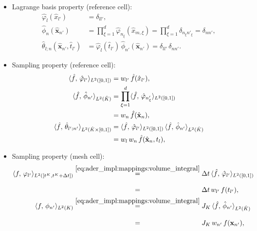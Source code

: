 \documentclass{scrreprt}
\theoremstyle{definition}
\theoremstyle{nonumberplain}
\renewcommand{\vec}[1]{{\textbf{#1}}}
\newcommand{\cell}{K}
\newcommand{\refVec}[1]{\hat{\vec{#1}}}
\newcommand{\refCell}{\hat{\cell}}
\newcommand{\detJ}{J_\cell}
\begin{document}
\begin{itemize}
  \item Lagrange basis property (reference cell):
  \begin{align}
\label{eq:ader_impl:basis:lagrange_ref_1d}
{\hat{\varphi}}_{l} (\hat{x}_{l'}) &= \delta_{ll'},\\
{\hat{\phi}}_{n} (\refVec{x}_{n'}) &= \prod_{\xi=1}^d
{\hat{\varphi}}_{n_{\xi}} (\hat{x}_{m,\xi})
=
\prod_{\xi=1}^{d}
\delta_{n_\xi n'_\xi}
= \delta_{n n'},
\\
{\hat{\theta}}_{l;n} (\refVec{x}_{n'},\hat{t}_{l'}) &=
\hat{\varphi}_{l}(\hat{t}_{l'})\,{\hat{\phi}}_{n'} (\refVec{x}_{n'})
= \delta_{l l'}\,\delta_{n n'}.
\end{align}
\item Sampling property (reference cell):
\begin{align}
\label{eq:ader_impl:basis:sampling_ref_1d}
\langle \hat{f},\,\hat{\varphi}_{l'}\rangle_{L^2([0,1])} &=
w_{l'}\,\hat{f}(\hat{x}_{l'}),
\\
\langle \hat{f},\,\hat{\phi}_{n'}\rangle_{L^2(\refCell)}
&=
\prod_{\xi=1}^d
\langle \hat{f},\,\hat{\varphi}_{n'_\xi}\rangle_{L^2([0,1])}
\notag\\
&=
w_{n}\,
\hat{f}(\refVec{x}_n),
\\
\langle\hat{f},\,\hat{\theta}_{l';n'}\rangle
_{L^2(\refCell\times[0,1])}
&= 
\langle \hat{f},\,\hat{\varphi}_{l'}\rangle_{L^2([0,1])}\,
\langle \hat{f},\,\hat{\phi}_{n'}\rangle_{L^2(\refCell)} 
\notag
\\
&= w_{l}\,w_{n}\,
\hat{f}(\refVec{x}_n,t_l),
\end{align}
\item Sampling property (mesh cell):
\begin{align}
\label{eq:ader_impl:basis:sampling_mesh_1d}
\langle f,\,\varphi_{l'}\rangle_{L^2([t^\cell,t^\cell+\Delta t])}
&
\overset{\eqref{eq:ader_impl:mappings:volume_integral}}{=}
\Delta t\,
\langle \hat{f},\,\hat{\varphi}_{l'}\rangle_{L^2([0,1])} \\
&\overset{\phantom{\eqref{eq:ader_impl:mappings:volume_integral}}}{=}
\Delta t\,w_{l'}\,f(t_{l'}),
\\
\label{eq:ader_impl:basis:sampling_mesh_3d}
\langle f,\,\phi_{n'}\rangle_{L^2(\cell)}
&\overset{\eqref{eq:ader_impl:mappings:volume_integral}}{=}
\detJ\,
\langle \hat{f},\,\hat{\phi}_{n'}\rangle_{L^2(\refCell)}
\notag\\
&\overset{\phantom{\eqref{eq:ader_impl:mappings:volume_integral}}}{=}
\detJ\,
w_{n'}\,
f(\vec{x}_{n'}),

\end{align}
\end{itemize}
\end{document}
